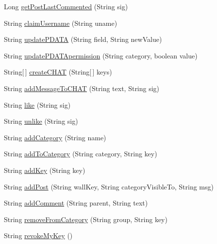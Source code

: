 \begin{DoxyCompactItemize}
Long \hyperlink{interfaceballmerpeak_1_1turtlenet_1_1client_1_1Turtlenet_afe7fb0ea0aa816d74bf768586a790920}{get\-Post\-Last\-Commented} (String sig)
\item 
String \hyperlink{interfaceballmerpeak_1_1turtlenet_1_1client_1_1Turtlenet_ae48f0a9d17c153ea02178f15921adbb3}{claim\-Username} (String uname)
\item 
String \hyperlink{interfaceballmerpeak_1_1turtlenet_1_1client_1_1Turtlenet_a7bd4e01c7a9b31062600215c190b2203}{update\-P\-D\-A\-T\-A} (String field, String new\-Value)
\item 
String \hyperlink{interfaceballmerpeak_1_1turtlenet_1_1client_1_1Turtlenet_a169f35c3f487d0282c9cca1c69ef0864}{update\-P\-D\-A\-T\-Apermission} (String category, boolean value)
\item 
String\mbox{[}$\,$\mbox{]} \hyperlink{interfaceballmerpeak_1_1turtlenet_1_1client_1_1Turtlenet_a73d0ea7f23c65c50b767ad11a15eb551}{create\-C\-H\-A\-T} (String\mbox{[}$\,$\mbox{]} keys)
\item 
String \hyperlink{interfaceballmerpeak_1_1turtlenet_1_1client_1_1Turtlenet_a21764196c7d0327729b959b3b989390f}{add\-Message\-To\-C\-H\-A\-T} (String text, String sig)
\item 
String \hyperlink{interfaceballmerpeak_1_1turtlenet_1_1client_1_1Turtlenet_a53b64b52b96b7867401e49a98ad3c56c}{like} (String sig)
\item 
String \hyperlink{interfaceballmerpeak_1_1turtlenet_1_1client_1_1Turtlenet_a06c7c35b8729183e426c463fbff37b6a}{unlike} (String sig)
\item 
String \hyperlink{interfaceballmerpeak_1_1turtlenet_1_1client_1_1Turtlenet_a2ef6a7f00e36033f8dc013f9a4de2dff}{add\-Category} (String name)
\item 
String \hyperlink{interfaceballmerpeak_1_1turtlenet_1_1client_1_1Turtlenet_ae9cd677b3fa8a8a9114297e58047abe3}{add\-To\-Category} (String category, String key)
\item 
String \hyperlink{interfaceballmerpeak_1_1turtlenet_1_1client_1_1Turtlenet_aefdafb728b08fcd230ed1ca26bf4ce9f}{add\-Key} (String key)
\item 
String \hyperlink{interfaceballmerpeak_1_1turtlenet_1_1client_1_1Turtlenet_a820a403aab7aeaa167cfef0f9a57c47e}{add\-Post} (String wall\-Key, String category\-Visible\-To, String msg)
\item 
String \hyperlink{interfaceballmerpeak_1_1turtlenet_1_1client_1_1Turtlenet_a5b9f57137f7abaca7713840d42918434}{add\-Comment} (String parent, String text)
\item 
String \hyperlink{interfaceballmerpeak_1_1turtlenet_1_1client_1_1Turtlenet_a3428354990f73f31969b9965ac84f279}{remove\-From\-Category} (String group, String key)
\item 
String \hyperlink{interfaceballmerpeak_1_1turtlenet_1_1client_1_1Turtlenet_a8630df1f1be5f09e7a258d2f8ab00feb}{revoke\-My\-Key} ()
\end{DoxyCompactItemize}


